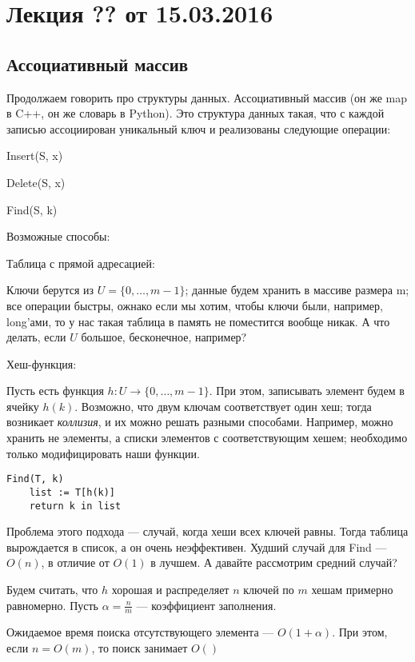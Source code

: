 



\section*{Лекция ?? от 15.03.2016}

\subsection{Ассоциативный массив}

Продолжаем говорить про структуры данных. Ассоциативный массив (он же map в C++, он же словарь в Python). Это структура данных такая, что с каждой записью ассоциирован уникальный ключ и реализованы следующие операции:

Insert(S, x)

Delete(S, x)

Find(S, k)

Возможные способы:

Таблица с прямой адресацией:

Ключи берутся из $U = \{0,\ldots, m-1\}$; данные будем хранить в массиве размера m; все операции быстры, ожнако если мы хотим, чтобы ключи были, например, long'ами, то у нас такая таблица в память не поместится вообще никак. А что делать, если $U$ большое, бесконечное, например?

Хеш-функция:

Пусть есть функция $h: U\to \{0, \ldots, m-1\}$. При этом, записывать элемент будем в ячейку $h(k)$. Возможно, что двум ключам соответствует один хеш; тогда возникает \emph{коллизия}, и их можно решать разными способами. Например, можно хранить не элементы, а списки элементов с соответствующим хешем; необходимо только модифицировать наши функции.

\begin{lstlisting}
Find(T, k)
    list := T[h(k)]
    return k in list
\end{lstlisting}

Проблема этого подхода --- случай, когда хеши всех ключей равны. Тогда таблица вырождается в список, а он очень неэффективен. Худший случай для Find --- $O(n)$, в отличие от $O(1)$ в лучшем. А давайте рассмотрим средний случай?

Будем считать, что $h$ хорошая и распределяет $n$ ключей по $m$ хешам примерно равномерно. Пусть $\alpha = \frac{n}{m}$ --- коэффициент заполнения.

Ожидаемое время поиска отсутствующего элемента --- $O(1+\alpha)$. При этом, если $n = O(m)$, то поиск занимает $O()$

